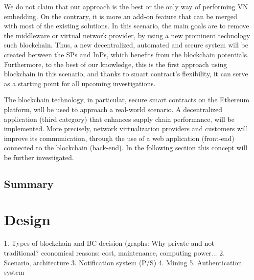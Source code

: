 We do not claim that our approach is the best or the only way
of performing VN embedding. On the contrary, it is more an add-on feature that can be merged with most of the existing solutions. In this scenario, the main goals are to remove the middleware or virtual network provider, by using a new prominent technology such blockchain. Thus, a new decentralized, automated and secure system will be created between the SPs and InPs, which benefits from the blockchain potentials. Furthermore, to the best of our knowledge, this is the first approach using blockchain in this scenario, and thanks to smart contract's flexibility, it can serve as a starting point for all upcoming investigations.



The blockchain technology, in particular, secure smart contracts on the Ethereum platform, will be used to approach a real-world scenario. A decentralized application (third category) that enhances supply chain performance, will be implemented. More precisely, network virtualization providers and customers will improve its communication, through the use of a web application (front-end) connected to the blockchain (back-end). In the following section this concept will be further investigated.

\section{Summary}



\chapter{Design}
\label{ch:design}


1. Types of blockchain and BC decision (graphs: Why private and not traditional? economical reasons: cost, maintenance, computing power...
2. Scenario, architecture
3. Notification system (P/S)
4. Mining
5. Authentication system


